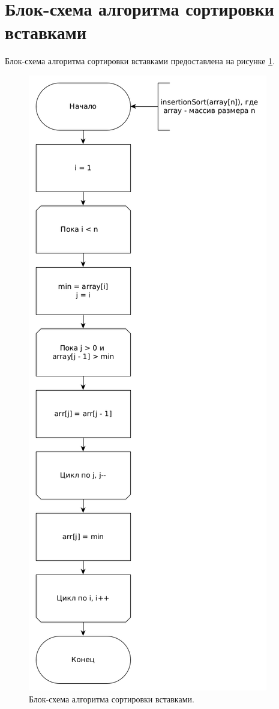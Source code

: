 \documentclass[12pt]{report}
\begin{document}
\section{Блок-схема алгоритма сортировки вставками}
Блок-схема алгоритма сортировки вставками предоставлена на рисунке \ref{img:insertionSortScheme}.

\begin{figure}
\begin{center}
\includegraphics[scale=0.4]{inc/img/insertionSort.png}
\captionsetup{justification=centering}
	\caption{Блок-схема алгоритма сортировки вставками.}
	\label{img:insertionSortScheme}	
\end{center}
\end{figure}
\end{document}
